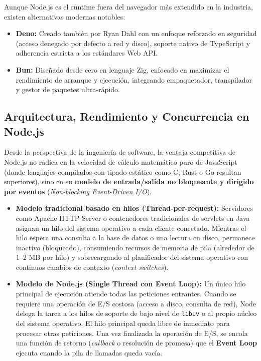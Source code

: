 Aunque Node.js es el runtime fuera del navegador más extendido en la industria, existen alternativas modernas notables:
\begin{itemize}
    \item \textbf{Deno:} Creado también por Ryan Dahl con un enfoque reforzado en seguridad (acceso denegado por defecto a red y disco), soporte nativo de TypeScript y adherencia estricta a los estándares Web API.
    \item \textbf{Bun:} Diseñado desde cero en lenguaje Zig, enfocado en maximizar el rendimiento de arranque y ejecución, integrando empaquetador, transpilador y gestor de paquetes ultra-rápido.
\end{itemize}

\subsection{Arquitectura, Rendimiento y Concurrencia en Node.js}

Desde la perspectiva de la ingeniería de software, la ventaja competitiva de Node.js no radica en la velocidad de cálculo matemático puro de JavaScript (donde lenguajes compilados con tipado estático como C, Rust o Go resultan superiores), sino en su \textbf{modelo de entrada/salida no bloqueante y dirigido por eventos} (\emph{Non-blocking Event-Driven I/O}).

\begin{itemize}
    \item \textbf{Modelo tradicional basado en hilos (Thread-per-request):} Servidores como Apache HTTP Server o contenedores tradicionales de servlets en Java asignan un hilo del sistema operativo a cada cliente conectado. Mientras el hilo espera una consulta a la base de datos o una lectura en disco, permanece inactivo (bloqueado), consumiendo recursos de memoria de pila (alrededor de 1--2 MB por hilo) y sobrecargando al planificador del sistema operativo con continuos cambios de contexto (\emph{context switches}).
    \item \textbf{Modelo de Node.js (Single Thread con Event Loop):} Un único hilo principal de ejecución atiende todas las peticiones entrantes. Cuando se requiere una operación de E/S costosa (acceso a disco, consulta de red), Node delega la tarea a los hilos de soporte de bajo nivel de \texttt{libuv} o al propio núcleo del sistema operativo. El hilo principal queda libre de inmediato para procesar otras peticiones. Una vez finalizada la operación de E/S, se encola una función de retorno (\emph{callback} o resolución de promesa) que el \textbf{Event Loop} ejecuta cuando la pila de llamadas queda vacía.
\end{itemize}

